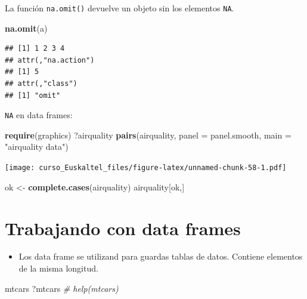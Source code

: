 \documentclass[]{book}
\newenvironment{Shaded}{\begin{snugshade}}{\end{snugshade}}
\newcommand{\KeywordTok}[1]{\textcolor[rgb]{0.13,0.29,0.53}{\textbf{#1}}}
\newcommand{\DataTypeTok}[1]{\textcolor[rgb]{0.13,0.29,0.53}{#1}}
\newcommand{\StringTok}[1]{\textcolor[rgb]{0.31,0.60,0.02}{#1}}
\newcommand{\CommentTok}[1]{\textcolor[rgb]{0.56,0.35,0.01}{\textit{#1}}}
\newcommand{\NormalTok}[1]{#1}
\providecommand{\tightlist}{%
  \setlength{\itemsep}{0pt}\setlength{\parskip}{0pt}}
\begin{document}
La función \texttt{na.omit()} devuelve un objeto sin los elementos
\texttt{NA}.

\begin{Shaded}
\begin{Highlighting}[]
\KeywordTok{na.omit}\NormalTok{(a) }
\end{Highlighting}
\end{Shaded}

\begin{verbatim}
## [1] 1 2 3 4
## attr(,"na.action")
## [1] 5
## attr(,"class")
## [1] "omit"
\end{verbatim}

\texttt{NA} en data frames:

\begin{Shaded}
\begin{Highlighting}[]
\KeywordTok{require}\NormalTok{(graphics)}
\NormalTok{?airquality}
\KeywordTok{pairs}\NormalTok{(airquality, }\DataTypeTok{panel =}\NormalTok{ panel.smooth, }\DataTypeTok{main =} \StringTok{"airquality data"}\NormalTok{)}
\end{Highlighting}
\end{Shaded}

\texttt{[image: curso\_Euskaltel\_files/figure-latex/unnamed-chunk-58-1.pdf]}

\begin{Shaded}
\begin{Highlighting}[]
\NormalTok{ok <-}\StringTok{ }\KeywordTok{complete.cases}\NormalTok{(airquality)}
\NormalTok{airquality[ok,]}
\end{Highlighting}
\end{Shaded}

\section{Trabajando con data frames}\label{trabajando-con-data-frames-1}

\begin{itemize}
\tightlist
\item
  Los data frame se utilizand para guardas tablas de datos. Contiene
  elementos de la misma longitud.
\end{itemize}

\begin{Shaded}
\begin{Highlighting}[]
\NormalTok{mtcars}
\NormalTok{?mtcars       }\CommentTok{# help(mtcars)}
\end{Highlighting}
\end{Shaded}
\end{document}
